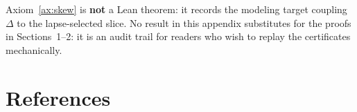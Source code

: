 \documentclass[11pt,a4paper]{article}
\theoremstyle{plain}
\theoremstyle{definition}
\theoremstyle{remark}
\theoremstyle{plain}
\theoremstyle{definition}
\begin{document}
Axiom~\ref{ax:skew} is \textbf{not} a Lean theorem: it records the modeling target coupling $\Delta$ to the lapse-selected slice.
No result in this appendix substitutes for the proofs in Sections~1--2: it is an audit trail for readers who wish to replay the certificates mechanically.

\section*{References}


\end{document}
